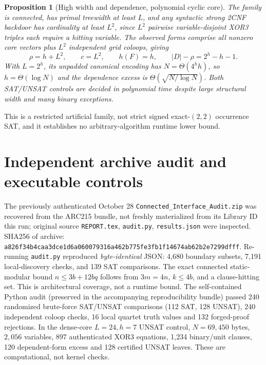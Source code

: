 \documentclass[11pt]{article}
\newtheorem{proposition}[theorem]{Proposition}
\begin{document}
\begin{proposition}[High width and dependence, polynomial cyclic core]
The family is connected, has primal treewidth at least $L$, and any syntactic strong 2CNF backdoor has cardinality at least $L^2$, since $L^2$ pairwise variable-disjoint XOR3 triples each require a hitting variable. The observed forms comprise all nonzero core vectors plus $L^2$ independent grid coloops, giving
\[
\rho=h+L^2,\qquad c=L^2,\qquad h(F)=h,\qquad
|D|-\rho=2^h-h-1.
\]
With $L=2^h$, its unpadded canonical encoding has $N=\Theta(4^h h)$, so $h=\Theta(\log N)$ and the dependence excess is $\Theta(\sqrt{N/\log N})$. Both SAT/UNSAT controls are decided in polynomial time despite large structural width and many binary exceptions.
\end{proposition}
This is a restricted artificial family, not strict signed exact-$(2,2)$ occurrence SAT, and it establishes no arbitrary-algorithm runtime lower bound.

\section{Independent archive audit and executable controls}
The previously authenticated October 28 \texttt{Connected\_Interface\_Audit.zip} was recovered from the ARC215 bundle, not freshly materialized from its Library ID this run; original source \texttt{REPORT.tex}, \texttt{audit.py}, \texttt{results.json} were inspected. SHA256 of archive:
\texttt{a826f34b4caa3dce1d6a060079316a462b775fe3fb1f14674ab62b2e7299dfff}.
Re-running \texttt{audit.py} reproduced \emph{byte-identical} JSON: 4,680 boundary subsets, 7,191 local-discovery checks, and 139 SAT comparisons. The exact connected static-modular bound $n\le3b+12bq$ follows from $3m=4n$, $k\le4b$, and a clause-hitting set. This is architectural coverage, not a runtime bound.
The self-contained Python audit (preserved in the accompanying reproducibility bundle) passed 240 randomized brute-force SAT/UNSAT comparisons (112 SAT, 128 UNSAT), 240 independent coloop checks, 16 local quartet truth values and 132 forged-proof rejections. In the dense-core $L=24,h=7$ UNSAT control, $N=69{,}450$ bytes, $2{,}056$ variables, 897 authenticated XOR3 equations, 1,234 binary/unit clauses, 120 dependent-form excess and 128 certified UNSAT leaves. These are computational, not kernel checks.
\end{document}
